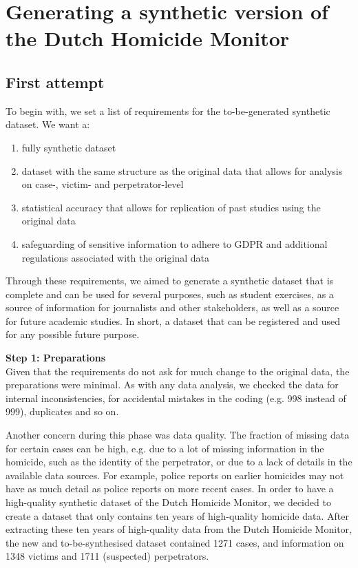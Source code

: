 
\section{Generating a synthetic version of the Dutch Homicide Monitor}

\subsection{First attempt}

To begin with, we set a list of requirements for the to-be-generated synthetic dataset. We want a: 

\begin{enumerate}[label=\alph*)]
	\item fully synthetic dataset
	\item dataset with the same structure as the original data that allows for analysis on case-, victim- and perpetrator-level
	\item statistical accuracy that allows for replication of past studies using the original data
	\item safeguarding of sensitive information to adhere to GDPR and additional regulations associated with the original data
\end{enumerate}

Through these requirements, we aimed to generate a synthetic dataset that is complete and can be used for several purposes, such as student exercises, as a source of information for journalists and other stakeholders, as well as a source for future academic studies. In short, a dataset that can be registered and used for any possible future purpose.

\textbf{Step 1: Preparations} \\
Given that the requirements do not ask for much change to the original data, the preparations were minimal. As with any data analysis, we checked the data for internal inconsistencies, for accidental mistakes in the coding (e.g. 998 instead of 999), duplicates and so on.

Another concern during this phase was data quality. The fraction of missing data for certain cases can be high, e.g. due to a lot of missing information in the homicide, such as the identity of the perpetrator, or due to a lack of details in the available data sources. For example, police reports on earlier homicides may not have as much detail as police reports on more recent cases. In order to have a high-quality synthetic dataset of the Dutch Homicide Monitor, we decided to create a dataset that only contains ten years of high-quality homicide data.  After extracting these ten years of high-quality data from the Dutch Homicide Monitor, the new and to-be-synthesised dataset contained 1271 cases, and information on 1348 victims and 1711 (suspected) perpetrators. 

